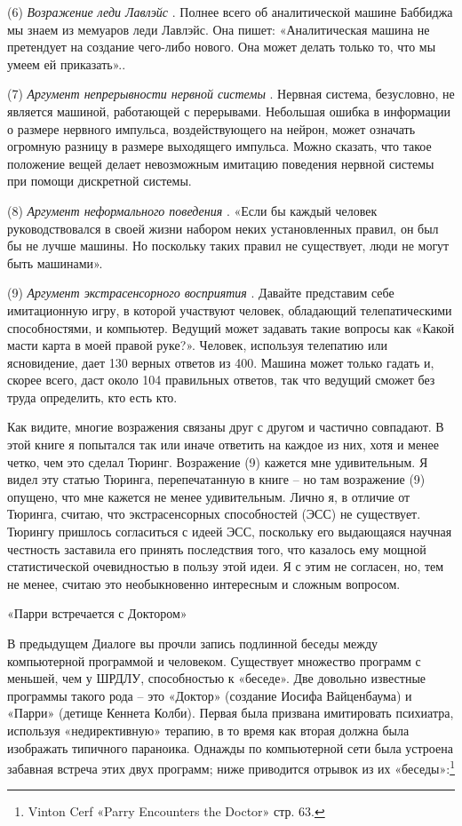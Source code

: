 \documentclass[../main.tex]{subfiles}
\begin{document}
(6) \emph{Возражение леди Лавлэйс} . Полнее всего об аналитической машине Баббиджа мы знаем из мемуаров леди Лавлэйс. Она пишет: «Аналитическая машина не претендует на создание чего-либо нового. Она может делать только то, что мы умеем ей приказать»..

(7) \emph{Аргумент непрерывности нервной системы} . Нервная система, безусловно, не является машиной, работающей с перерывами. Небольшая ошибка в информации о размере нервного импульса, воздействующего на нейрон, может означать огромную разницу в размере выходящего импульса. Можно сказать, что такое положение вещей делает невозможным имитацию поведения нервной системы при помощи дискретной системы.

(8) \emph{Аргумент неформального поведения} . «Если бы каждый человек руководствовался в своей жизни набором неких установленных правил, он был бы не лучше машины. Но поскольку таких правил не существует, люди не могут быть машинами».

(9) \emph{Аргумент экстрасенсорного восприятия} . Давайте представим себе имитационную игру, в которой участвуют человек, обладающий телепатическими способностями, и компьютер. Ведущий может задавать такие вопросы как «Какой масти карта в моей правой руке?». Человек, используя телепатию или ясновидение, дает 130 верных ответов из 400. Машина может только гадать и, скорее всего, даст около 104 правильных ответов, так что ведущий сможет без труда определить, кто есть кто.

Как видите, многие возражения связаны друг с другом и частично совпадают. В этой книге я попытался так или иначе ответить на каждое из них, хотя и менее четко, чем это сделал Тюринг. Возражение (9) кажется мне удивительным. Я видел эту статью Тюринга, перепечатанную в книге \--- но там возражение (9) опущено, что мне кажется не менее удивительным. Лично я, в отличие от Тюринга, считаю, что экстрасенсорных способностей (ЭСС) не существует. Тюрингу пришлось согласиться с идеей ЭСС, поскольку его выдающаяся научная честность заставила его принять последствия того, что казалось ему мощной статистической очевидностью в пользу этой идеи. Я с этим не согласен, но, тем не менее, считаю это необыкновенно интересным и сложным вопросом.

«Парри встречается с Доктором»

В предыдущем Диалоге вы прочли запись подлинной беседы между компьютерной программой и человеком. Существует множество программ с меньшей, чем у ШРДЛУ, способностью к «беседе». Две довольно известные программы такого рода \--- это «Доктор» (создание Иосифа Вайценбаума) и «Парри» (детище Кеннета Колби). Первая была призвана имитировать психиатра, используя «недирективную» терапию, в то время как вторая должна была изображать типичного параноика. Однажды по компьютерной сети была устроена забавная встреча этих двух программ; ниже приводится отрывок из их «беседы»:\footnote{Vinton Cerf «Parry Encounters the Doctor» стр. 63.}
\end{document}

